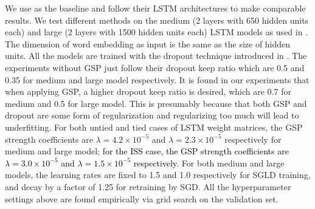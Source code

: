 \documentclass{article} %
\newcommand{\zyc}{\textcolor{black}}
\begin{document}
We use \citet{zaremba2014recurrent} as the baseline and follow their LSTM architectures to make comparable results. 
We test different methods on the medium (2 layers with 650 hidden units each) and large (2 layers with 1500 hidden units each) LSTM models as used in \citet{zaremba2014recurrent}. 
The dimension of word embedding as input is the same as the size of hidden units. 
All the models are trained with the dropout technique introduced in \citet{zaremba2014recurrent}. The experiments without GSP just follow their dropout keep ratio which are 0.5 and 0.35 for medium and large model respectively. 
It is found in our experiments that when applying GSP, a higher dropout keep ratio is desired, which are 0.7 for medium and 0.5 for large model.
This is presumably because that both GSP and dropout are some form of regularization and regularizing too much will lead to underfitting. 
For both untied and tied cases of LSTM weight matrices, the GSP strength coefficients are $ \lambda=4.2\times10^{-5} $ and $ \lambda=2.3\times10^{-5} $ respectively for medium and large model; \zyc{for the ISS case, the GSP strength coefficients are $ \lambda=3.0\times10^{-5} $ and $ \lambda=1.5\times10^{-5} $ respectively.}
For both medium and large models, the learning rates are fixed to 1.5 and 1.0 respectively for SGLD training, and decay by a factor of 1.25 for retraining by SGD. 
All the hyperparameter settings above are found empirically via grid search on the validation set.
\end{document}
